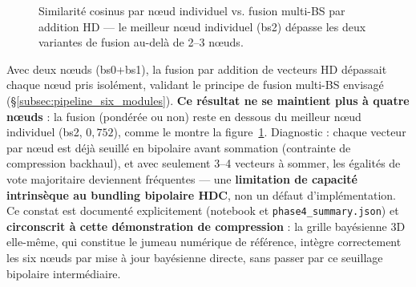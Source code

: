 \documentclass[12pt,a4paper,titlepage]{article}
\begin{document}
\begin{figure}[H]
    \centering
    \caption{Similarité cosinus par n\oe ud individuel vs. fusion multi-BS par addition HD --- le meilleur n\oe ud individuel (bs2) dépasse les deux variantes de fusion au-delà de 2--3 n\oe uds.}
    \label{fig:chart_hd_fusion}
\end{figure}

Avec deux n\oe uds (bs0+bs1), la fusion par addition de vecteurs HD dépassait chaque n\oe ud pris isolément, validant le principe de fusion multi-BS envisagé (\S\ref{subsec:pipeline_six_modules}). \textbf{Ce résultat ne se maintient plus à quatre n\oe uds} : la fusion (pondérée ou non) reste en dessous du meilleur n\oe ud individuel (bs2, $0{,}752$), comme le montre la figure~\ref{fig:chart_hd_fusion}. Diagnostic : chaque vecteur par n\oe ud est déjà seuillé en bipolaire avant sommation (contrainte de compression backhaul), et avec seulement 3--4 vecteurs à sommer, les égalités de vote majoritaire deviennent fréquentes --- une \textbf{limitation de capacité intrinsèque au bundling bipolaire HDC}, non un défaut d'implémentation. Ce constat est documenté explicitement (notebook et \texttt{phase4\_summary.json}) et \textbf{circonscrit à cette démonstration de compression} : la grille bayésienne 3D elle-même, qui constitue le jumeau numérique de référence, intègre correctement les six n\oe uds par mise à jour bayésienne directe, sans passer par ce seuillage bipolaire intermédiaire.
\end{document}
